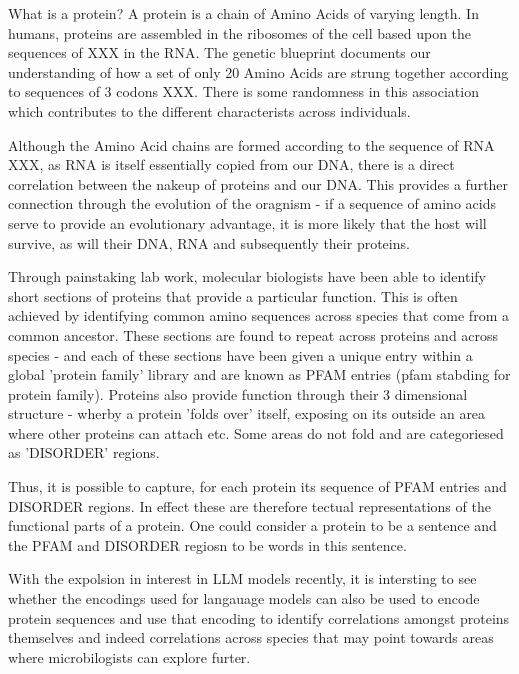 \documentclass{article}
\begin{document}
What is a protein?
A protein is a chain of Amino Acids of varying length. In humans, proteins are assembled in the ribosomes of the cell based upon the sequences of XXX in the RNA. The genetic blueprint documents our understanding of how a set of only 20 Amino Acids are strung together according to sequences of 3 codons XXX. There is some randomness in this association which contributes to the different characterists across individuals.

Although the Amino Acid chains are formed according to the sequence of RNA XXX, as RNA is itself essentially copied from our DNA, there is a direct correlation between the nakeup of proteins and our DNA. This provides a further connection through the evolution of the oragnism - if a sequence of amino acids serve to provide an evolutionary advantage, it is more likely that the host will survive, as will their DNA, RNA and subsequently their proteins.

Through painstaking lab work, molecular biologists have been able to identify short sections of proteins that provide a particular function. This is often achieved by identifying common amino sequences across species that come from a common ancestor. These sections are found to repeat across proteins and across species - and each of these sections have been given a unique entry within a global 'protein family' library and are known as PFAM entries (pfam stabding for protein family). Proteins also provide function through their 3 dimensional structure - wherby a protein 'folds over' itself, exposing on its outside an area where other proteins can attach etc. Some areas do not fold and are categoriesed as 'DISORDER' regions.

Thus, it is possible to capture, for each protein its sequence of PFAM entries and DISORDER regions. In effect these are therefore tectual representations of the functional parts of a protein. One could consider a protein to be a sentence and the PFAM and DISORDER regiosn to be words in this sentence.

With the expolsion in interest in LLM models recently, it is intersting to see whether the encodings used for langauage models can also be used to encode protein sequences and use that encoding to identify correlations amongst proteins themselves and indeed correlations across species that may point towards areas where microbilogists can explore furter.

\pagebreak
\end{document}
